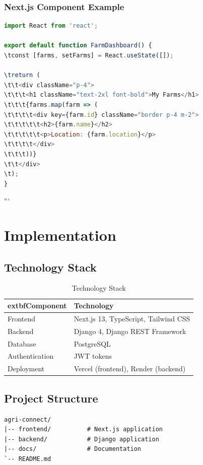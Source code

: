 \subsubsection{Next.js Component Example}
\begin{lstlisting}[language=JavaScript, caption=Farm Dashboard Component]
import React from 'react';

export default function FarmDashboard() {
\tconst [farms, setFarms] = React.useState([]);
    
\treturn (
\t\t<div className="p-4">
\t\t\t<h1 className="text-2xl font-bold">My Farms</h1>
\t\t\t{farms.map(farm => (
\t\t\t\t<div key={farm.id} className="border p-4 m-2">
\t\t\t\t\t<h2>{farm.name}</h2>
\t\t\t\t\t<p>Location: {farm.location}</p>
\t\t\t\t</div>
\t\t\t))}
\t\t</div>
\t);
}
\end{lstlisting}
```
\section{Implementation}

\subsection{Technology Stack}
\begin{table}[H]
	\centering
	\begin{tabular}{|l|l|}
		\hline
			extbf{Component} & \textbf{Technology} \\
		\hline
		Frontend & Next.js 13, TypeScript, Tailwind CSS \\
		Backend & Django 4, Django REST Framework \\
		Database & PostgreSQL \\
		Authentication & JWT tokens \\
		Deployment & Vercel (frontend), Render (backend) \\
		\hline
	\end{tabular}
	\caption{Technology Stack}
	\label{tab:techstack}
\end{table}

\subsection{Project Structure}
\begin{verbatim}
agri-connect/
|-- frontend/          # Next.js application
|-- backend/           # Django application
|-- docs/              # Documentation
`-- README.md
\end{verbatim}

